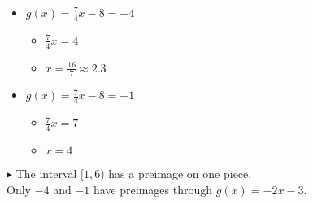 \documentclass{ximera}
\begin{document}
\begin{itemize}
\item $g(x) = \frac{7}{4}x -8 = -4$
\begin{itemize}
\item $\frac{7}{4}x = 4$
\item $x = \frac{16}{7} \approx 2.3$
\end{itemize}
\end{itemize}




\begin{itemize}
\item $g(x) = \frac{7}{4}x -8 = -1$
\begin{itemize}
\item $\frac{7}{4}x = 7$
\item $x = 4$
\end{itemize}
\end{itemize}

















$\blacktriangleright$ The interval $[1, 6)$ has a preimage on one piece. \\
Only $-4$ and $-1$ have preimages through $g(x) = -2x-3$.
\end{document}
